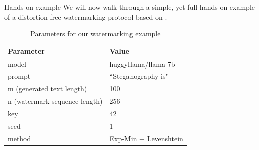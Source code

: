 \begin{frame}{Hands-on example}
    We will now walk through a simple, yet full hands-on example of a distortion-free watermarking protocol based on \cite{kuditipudi2023robustarticle}.

    \begin{table}[h]
        \centering
        \begin{tabular}{ll}
            \textbf{Parameter}            & \textbf{Value}        \\
            \hline
            model                         & huggyllama/llama-7b   \\
            prompt                        & ``Steganography is"   \\
            m (generated text length)     & 100                   \\
            n (watermark sequence length) & 256                   \\
            key                           & 42                    \\
            seed                          & 1                     \\
            method                        & Exp-Min + Levenshtein \\
        \end{tabular}
        \caption{\footnotesize Parameters for our watermarking example \cite{toller2025watermarking-notebook}}
    \end{table}
\end{frame}

